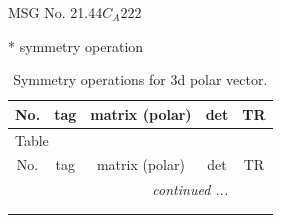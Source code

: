 \documentclass[fleqn,8pt]{jsarticle}
\begin{document}
\setcounter{MaxMatrixCols}{32}

\renewcommand{\tablename}{Table~}
\renewcommand{\figurename}{Figure~}
\begin{center}
\LARGE
MSG No. 21.44\quad$C_{A}222$
\end{center}
* symmetry operation
\renewcommand{\arraystretch}{1.3}
\begin{longtable}{ccccc}
\caption{Symmetry operations for 3d polar vector.}
 \\
 \hline \hline
No. & tag & matrix (polar) & det & TR \\ \hline \endfirsthead

\multicolumn{4}{l}{\tablename\ \thetable{}} \\
 \hline \hline
No. & tag & matrix (polar) & det & TR \\ \hline \endhead

 \hline \hline
\multicolumn{4}{r}{\footnotesize\it continued ...} \\ \endfoot

 \hline \hline
\multicolumn{4}{r}{} \\ \endlastfoot


\end{longtable}
\end{document}
